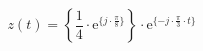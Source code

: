 \[
z(t) =  \left \{ \frac{1}{4} \cdot \textrm{e}^{\{ j \cdot \frac{\pi}{8} \}} \right \} \cdot \textrm{e}^{\{ -j \cdot \frac{\pi}{3} \cdot t \}}
\]
